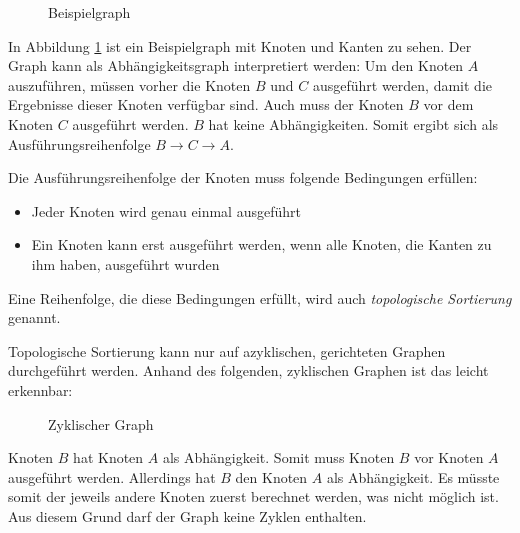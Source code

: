 \begin{figure}[H]
    \centering
    \caption{Beispielgraph}
    \label{fig:nodeExecutionOrder1}
\end{figure}

In Abbildung \ref{fig:nodeExecutionOrder1} ist ein Beispielgraph mit Knoten und Kanten zu sehen. Der Graph kann als Abhängigkeitsgraph interpretiert werden: Um den Knoten $A$ auszuführen, müssen vorher die Knoten $B$ und $C$ ausgeführt werden, damit die Ergebnisse dieser Knoten verfügbar sind. Auch muss der Knoten $B$ vor dem Knoten $C$ ausgeführt werden. $B$ hat keine Abhängigkeiten. Somit ergibt sich als Ausführungsreihenfolge $B \rightarrow C \rightarrow A$.

Die Ausführungsreihenfolge der Knoten muss folgende Bedingungen erfüllen:
\begin{itemize}
    \item Jeder Knoten wird genau einmal ausgeführt
    \item Ein Knoten kann erst ausgeführt werden, wenn alle Knoten, die Kanten zu ihm haben, ausgeführt wurden
\end{itemize}

Eine Reihenfolge, die diese Bedingungen erfüllt, wird auch \textit{topologische Sortierung} genannt.

Topologische Sortierung kann nur auf azyklischen, gerichteten Graphen durchgeführt werden. Anhand des folgenden, zyklischen Graphen ist das leicht erkennbar:
\begin{figure}[H]
    \centering
    \caption{Zyklischer Graph}
    \label{fig:cyclicGraph}
\end{figure}
Knoten $B$ hat Knoten $A$ als Abhängigkeit. Somit muss Knoten $B$ vor Knoten $A$ ausgeführt werden. Allerdings hat $B$ den Knoten $A$ als Abhängigkeit. Es müsste somit der jeweils andere Knoten zuerst berechnet werden, was nicht möglich ist. Aus diesem Grund darf der Graph keine Zyklen enthalten.

